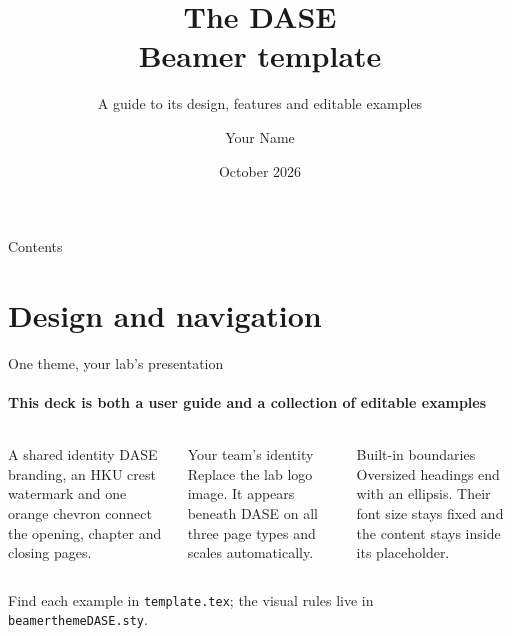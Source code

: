 \documentclass[aspectratio=169,10pt]{beamer}
\title[DASE template]{The DASE\\Beamer template}
\subtitle{A guide to its design, features and editable examples}
\author[Your Name]{Your Name}
\institute[HKU Engineering]{HKU School of Engineering}
\date{October 2026}
\begin{document}
\begin{frame}[plain]
  \titlepage
\end{frame}

\begin{frame}{Contents}
  \tableofcontents[hideallsubsections]
\end{frame}

\section{Design and navigation}

\begin{frame}{One theme, your lab's presentation}
  \framesubtitle{This deck is both a user guide and a collection of editable examples}
  \begin{columns}[T,onlytextwidth]
      \begin{block}{A shared identity}
        DASE branding, an HKU crest watermark and one orange chevron connect the opening, chapter and closing pages.
      \end{block}
      \begin{exampleblock}{Your team's identity}
        Replace the lab logo image. It appears beneath DASE on all three page types and scales automatically.
      \end{exampleblock}
      \begin{alertblock}{Built-in boundaries}
        Oversized headings end with an ellipsis. Their font size stays fixed and the content stays inside its placeholder.
      \end{alertblock}
  \end{columns}
  \vfill
  \textcolor{DASEslate}{\small Find each example in \texttt{template.tex}; the visual rules live in \texttt{beamerthemeDASE.sty}.}
\end{frame}
\end{document}

